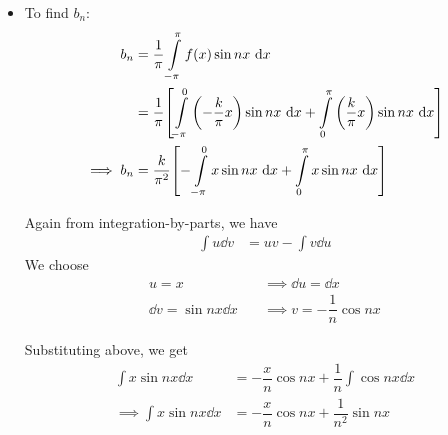 \begin{itemize}
            Hence, we obtain
            \begin{align*}
                a_n&=\begin{cases}
                    {-\dfrac{4k}{n^2\pi^2};} & {\text{for odd }n} \\
                    {0;} & {\text{for even }n}
                \end{cases}
            \end{align*}

            This gives us
            \begin{align*}
                a_1&=-\dfrac{4k}{\pi^2},\quad a_2=0,\quad a_3=-\dfrac{4k}{9\pi^2},\quad a_4=0,\quad a_5=-\dfrac{4k}{25\pi^2},\quad a_6=0,\quad\cdots
            \end{align*}

            \item To find $b_n$:
            \begin{align}
                b_n&=\dfrac{1}{\pi}\int\limits_{-\pi}^{\pi}{f(x)\sin{nx}\,\dd{x}} \nonumber\\
                    &=\dfrac{1}{\pi}\qty[\int\limits_{-\pi}^{0}{\qty(-\dfrac{k}{\pi}x)\sin{nx}\,\dd{x}}+\int\limits_{0}^{\pi}{\qty(\dfrac{k}{\pi}x)\sin{nx}\,\dd{x}}] \nonumber\\
                \implies b_n&=\dfrac{k}{\pi^2}\qty[-\int\limits_{-\pi}^{0}{x\sin{nx}\,\dd{x}}+\int\limits_{0}^{\pi}{x\sin{nx}\,\dd{x}}] \label{eqn:triangular:bn}
            \end{align}

            Again from integration-by-parts, we have
            \begin{align*}
                \int{u\dd{v}}&=uv-\int{v\dd{u}}
            \end{align*}
            We choose
            \begin{align*}
                u=x&\quad\implies\dd{u}=\dd{x} \\
                \dd{v}=\sin{nx}\dd{x}&\quad\implies v=-\dfrac{1}{n}\cos{nx}
            \end{align*}

            Substituting above, we get
            \begin{align*}
                \int{x\sin{nx}\dd{x}}&=-\dfrac{x}{n}\cos{nx}+\dfrac{1}{n}\int{\cos{nx}\dd{x}} \\
                \implies\int{x\sin{nx}\dd{x}}&=-\dfrac{x}{n}\cos{nx}+\dfrac{1}{n^2}\sin{nx}
            \end{align*}


\end{itemize}
